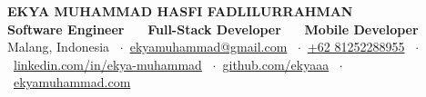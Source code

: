 \documentclass[10pt, a4paper]{article}
\begin{document}
\begin{center}
  {\LARGE \textbf{EKYA MUHAMMAD HASFI FADLILURRAHMAN}} \\[2pt]
  {\small \textbf{Software Engineer} \ \textbar\ \ \textbf{Full-Stack Developer} \ \textbar\ \ \textbf{Mobile Developer}} \\[2pt]
  {\footnotesize
    Malang, Indonesia \ $\cdot$\ 
    \href{mailto:ekyamuhammad@gmail.com}{ekyamuhammad@gmail.com} \ $\cdot$\ 
    \href{tel:+6281252288955}{+62 81252288955} \ $\cdot$\ 
    \href{https://linkedin.com/in/ekya-muhammad}{linkedin.com/in/ekya-muhammad} \ $\cdot$\ 
    \href{https://github.com/ekyaaa}{github.com/ekyaaa} \ $\cdot$\ 
    \href{https://www.ekyamuhammad.com}{ekyamuhammad.com}
  }
\end{center}
\vspace{-5pt plus 2pt}







\end{document}
